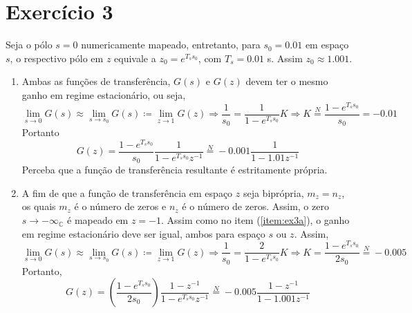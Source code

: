 \documentclass{article}
\begin{document}
\section*{Exercício 3}
Seja o pólo $s=0$ numericamente mapeado, entretanto, para $s_0 = 0.01$ em espaço $s$, o respectivo pólo em $z$ equivale a $z_0 = e^{T_s s_0}$, com $T_s = 0.01$ s. Assim $z_0 \approx 1.001$.
\begin{enumerate}
\item %
\label{item:ex3a}
Ambas as funções de transferência, $G(s)$ e $G(z)$ devem ter o mesmo ganho em regime estacionário, ou seja,
\begin{equation}
\lim\limits_{s \rightarrow 0} G(s) \approx  \lim\limits_{s \rightarrow s_0} G(s) \coloneqq \lim\limits_{z \rightarrow 1} G(z) \Rightarrow \frac{1}{s_0} = \frac{1}{1 - e^{T_s s_0}} K \Rightarrow K \stackrel{N}{=} \frac{1 - e^{T_s s_0}}{s_0} = - 0.01
\end{equation}
Portanto
\begin{equation}
G(z) = \frac{1 - e^{T_s s_0}}{s_0} \frac{1}{1 - e^{T_s s_0} z^{-1}} \stackrel{N}{=} -0.001 \frac{1}{1 - 1.01 z^{-1}}
\end{equation}
Perceba que a função de transferência resultante é estritamente própria.
\item %
A fim de que a função de transferência em espaço $z$ seja biprópria, $m_z = n_z$, os quais $m_z$ é o número de zeros e $n_z$ é o número de zeros. Assim, o zero $s \rightarrow - \infty_{\mathbb{C}}$ é mapeado em $z = -1$. Assim como no item (\ref{item:ex3a}), o ganho em regime estacionário deve ser igual, ambos para espaço $s$ ou $z$. Assim,
\begin{equation}
\lim\limits_{s \rightarrow 0} G(s) \approx  \lim\limits_{s \rightarrow s_0} G(s) \coloneqq \lim\limits_{z \rightarrow 1} G(z) \Rightarrow  \frac{1}{s_0} = \frac{2}{1 - e^{T_s s_0}} K \Rightarrow K = \frac{1 - e^{T_s s_0}}{2 s_0} \stackrel{N}{=} - 0.005
\end{equation}
Portanto,
\begin{equation}
G(z) =  \left( \frac{1 - e^{T_s s_0}}{2 s_0}\right) \frac{1-z^{-1}}{1 - e^{T_s s_0}  z^{-1}} \stackrel{N}{=} -0.005 \frac{1-z^{-1}}{1 - 1.001  z^{-1}}
\end{equation}
\end{enumerate}
\end{document}
